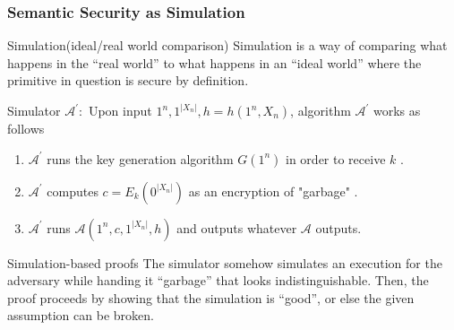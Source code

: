 \documentclass{beamer}
\begin{document}
    \begin{frame}
        \frametitle{Semantic Security as Simulation}
        \begin{block}{Simulation(ideal/real world comparison)}
            Simulation is a way of comparing what happens in the “real world” to what happens in an “ideal world” where the primitive in question is secure by definition.
        \end{block}
    
        Simulator $\mathcal{A}^{\prime}:$ Upon input $1^{n}, 1^{\left|X_{n}\right|}, h=h\left(1^{n}, X_{n}\right)$, algorithm $\mathcal{A}^{\prime}$ works as follows
        \begin{enumerate}
            \item $\mathcal{A}^{\prime}$ runs the key generation algorithm $G\left(1^{n}\right)$ in order to receive $k$ .
            \item $\mathcal{A}^{\prime}$ computes $c=E_{k}\left(0^{\left|X_{n}\right|}\right)$ as an encryption of "garbage" .
            \item $\mathcal{A}^{\prime}$ runs $\mathcal{A}\left(1^{n}, c, 1^{\left|X_{n}\right|}, h\right)$ and outputs whatever $\mathcal{A}$ outputs.
        \end{enumerate}
        

        \begin{block}{Simulation-based proofs}
            The simulator somehow simulates an execution for the adversary while handing it “garbage” that looks indistinguishable. Then, the proof proceeds by showing that the simulation is “good”, or else the given assumption can be broken.
        \end{block}
            
        
    
    \end{frame}
\end{document}
